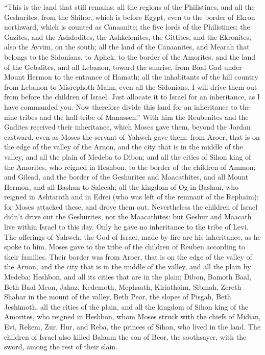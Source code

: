  ``This is the land that still remains: all the regions of
the Philistines, and all the Geshurites;  from the Shihor,
which is before Egypt, even to the border of Ekron northward, which is
counted as Canaanite; the five lords of the Philistines; the Gazites,
and the Ashdodites, the Ashkelonites, the Gittites, and the Ekronites;
also the Avvim,  on the south; all the land of the
Canaanites, and Mearah that belongs to the Sidonians, to Aphek, to the
border of the Amorites;  and the land of the Gebalites,
and all Lebanon, toward the sunrise, from Baal Gad under Mount Hermon to
the entrance of Hamath;  all the inhabitants of the hill
country from Lebanon to Misrephoth Maim, even all the Sidonians. I will
drive them out from before the children of Israel. Just allocate it to
Israel for an inheritance, as I have commanded you.  Now
therefore divide this land for an inheritance to the nine tribes and the
half-tribe of Manasseh.''  With him the Reubenites and the
Gadites received their inheritance, which Moses gave them, beyond the
Jordan eastward, even as Moses the servant of Yahweh gave them:
 from Aroer, that is on the edge of the valley of the
Arnon, and the city that is in the middle of the valley, and all the
plain of Medeba to Dibon;  and all the cities of Sihon
king of the Amorites, who reigned in Heshbon, to the border of the
children of Ammon;  and Gilead, and the border of the
Geshurites and Maacathites, and all Mount Hermon, and all Bashan to
Salecah;  all the kingdom of Og in Bashan, who reigned in
Ashtaroth and in Edrei (who was left of the remnant of the Rephaim); for
Moses attacked these, and drove them out.  Nevertheless
the children of Israel didn't drive out the Geshurites, nor the
Maacathites: but Geshur and Maacath live within Israel to this day.
 Only he gave no inheritance to the tribe of Levi. The
offerings of Yahweh, the God of Israel, made by fire are his
inheritance, as he spoke to him.  Moses gave to the tribe
of the children of Reuben according to their families. 
Their border was from Aroer, that is on the edge of the valley of the
Arnon, and the city that is in the middle of the valley, and all the
plain by Medeba;  Heshbon, and all its cities that are in
the plain; Dibon, Bamoth Baal, Beth Baal Meon,  Jahaz,
Kedemoth, Mephaath,  Kiriathaim, Sibmah, Zereth Shahar in
the mount of the valley,  Beth Peor, the slopes of
Pisgah, Beth Jeshimoth,  all the cities of the plain, and
all the kingdom of Sihon king of the Amorites, who reigned in Heshbon,
whom Moses struck with the chiefs of Midian, Evi, Rekem, Zur, Hur, and
Reba, the princes of Sihon, who lived in the land.  The
children of Israel also killed Balaam the son of Beor, the soothsayer,
with the sword, among the rest of their slain.

